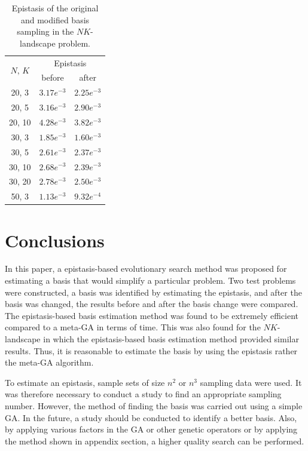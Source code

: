 \begin{table}[ht!]
	\caption{Epistasis of the original and modified basis sampling in the $NK$-landscape problem.} \label{tab:epi_nk}
	\vspace*{0.2cm}
	\centering
	\begin{tabular}{ccc}
		\toprule
		\multirow{2}{*}{$ N,\, K $} & \multicolumn{2}{c}{Epistasis} \\	\cmidrule(lr){2-3}
		& before & after \\
		\midrule
		20, 3	& $ 3.17e^{-3} $ & $ 2.25e^{-3} $ \\
		20, 5	& $ 3.16e^{-3} $ & $ 2.90e^{-3} $ \\
		20, 10	& $ 4.28e^{-3} $ & $ 3.82e^{-3} $ \\
		30, 3	& $ 1.85e^{-3} $ & $ 1.60e^{-3} $ \\
		30, 5	& $ 2.61e^{-3} $ & $ 2.37e^{-3} $ \\
		30, 10	& $ 2.68e^{-3} $ & $ 2.39e^{-3} $ \\
		30, 20	& $ 2.78e^{-3} $ & $ 2.50e^{-3} $ \\
		50, 3	& $ 1.13e^{-3} $ & $ 9.32e^{-4}  $ \\
		\bottomrule
	\end{tabular}
\end{table}


\section{Conclusions} \label{sec7:conclusions}
In this paper, a epistasis-based evolutionary search method was proposed for estimating a basis that would simplify a particular problem. Two test problems were constructed, a basis was identified by estimating the epistasis, and after the basis was changed, the results before and after the basis change were compared. The epistasis-based basis estimation method was found to be extremely efficient compared to a meta-GA in terms of time. This was also found for the $ NK $-landscape in which the epistasis-based basis estimation method provided similar results. Thus, it is reasonable to estimate the basis by using the epistasis rather the meta-GA algorithm.

To estimate an epistasis, sample sets of size $ n^2 $ or $ n^3 $ sampling data were used. It was therefore necessary to conduct a study to find an appropriate sampling number. However, the method of finding the basis was carried out using a simple GA. In the future, a study should be conducted to identify a better basis. Also, by applying various factors in the GA or other genetic operators or by applying the method shown in appendix section, a higher quality search can be performed.


